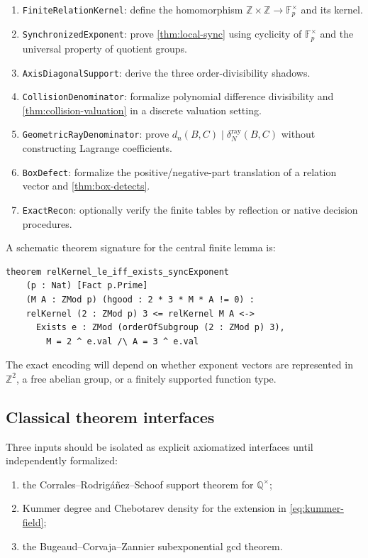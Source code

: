 \documentclass[11pt]{article}
\theoremstyle{definition}
\newcommand{\Z}{\mathbb Z}
\newcommand{\Q}{\mathbb Q}
\newcommand{\F}{\mathbb F}
\newcommand{\raydelta}{\delta^{\mathrm{ray}}}
\begin{document}
\begin{enumerate}[label=\texttt{K\arabic*.},leftmargin=1.45cm]
\item \texttt{FiniteRelationKernel}: define the homomorphism
$\Z\times\Z\to\F_p^\times$ and its kernel.
\item \texttt{SynchronizedExponent}: prove \cref{thm:local-sync} using cyclicity of
$\F_p^\times$ and the universal property of quotient groups.
\item \texttt{AxisDiagonalSupport}: derive the three order-divisibility shadows.
\item \texttt{CollisionDenominator}: formalize polynomial difference divisibility and
\cref{thm:collision-valuation} in a discrete valuation setting.
\item \texttt{GeometricRayDenominator}: prove
$d_n(B,C)\mid\raydelta_N(B,C)$ without constructing Lagrange coefficients.
\item \texttt{BoxDefect}: formalize the positive/negative-part translation of a relation
vector and \cref{thm:box-detects}.
\item \texttt{ExactRecon}: optionally verify the finite tables by reflection or native
decision procedures.
\end{enumerate}

A schematic theorem signature for the central finite lemma is:

\begin{lstlisting}[basicstyle=\ttfamily\footnotesize,frame=single,backgroundcolor=\color{codegray}]
theorem relKernel_le_iff_exists_syncExponent
    (p : Nat) [Fact p.Prime]
    (M A : ZMod p) (hgood : 2 * 3 * M * A != 0) :
    relKernel (2 : ZMod p) 3 <= relKernel M A <->
      Exists e : ZMod (orderOfSubgroup (2 : ZMod p) 3),
        M = 2 ^ e.val /\ A = 3 ^ e.val
\end{lstlisting}

The exact encoding will depend on whether exponent vectors are represented in $\Z^2$, a free
abelian group, or a finitely supported function type.

\subsection{Classical theorem interfaces}

Three inputs should be isolated as explicit axiomatized interfaces until independently
formalized:

\begin{enumerate}[label=\texttt{C\arabic*.},leftmargin=1.45cm]
\item the Corrales--Rodrig\'a\~nez--Schoof support theorem for $\Q^\times$;
\item Kummer degree and Chebotarev density for the extension in \eqref{eq:kummer-field};
\item the Bugeaud--Corvaja--Zannier subexponential gcd theorem.
\end{enumerate}
\end{document}

